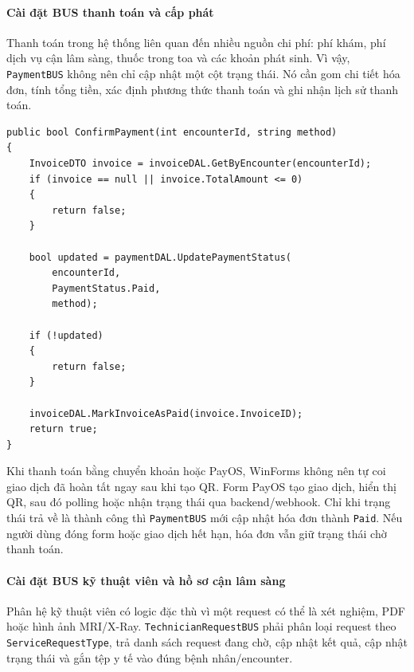 \documentclass[12pt,a4paper]{article}
\numberwithin{figure}{subsection}
\numberwithin{table}{subsection}
\newcounter{codecounter}
\newenvironment{codeblock}[2]{%
    \refstepcounter{codecounter}%
    \phantomsection%
    \label{#1}%
    \par\smallskip
}{%
    \par\smallskip
}
\begin{document}
\paragraph{Cài đặt BUS thanh toán và cấp phát}

Thanh toán trong hệ thống liên quan đến nhiều nguồn chi phí: phí khám, phí dịch vụ cận lâm sàng, thuốc trong toa và các khoản phát sinh. Vì vậy, \texttt{PaymentBUS} không nên chỉ cập nhật một cột trạng thái. Nó cần gom chi tiết hóa đơn, tính tổng tiền, xác định phương thức thanh toán và ghi nhận lịch sử thanh toán.

\begin{codeblock}{code:payment-business-flow}{Luồng xác nhận thanh toán trong BUS}
\begin{verbatim}
public bool ConfirmPayment(int encounterId, string method)
{
    InvoiceDTO invoice = invoiceDAL.GetByEncounter(encounterId);
    if (invoice == null || invoice.TotalAmount <= 0)
    {
        return false;
    }

    bool updated = paymentDAL.UpdatePaymentStatus(
        encounterId,
        PaymentStatus.Paid,
        method);

    if (!updated)
    {
        return false;
    }

    invoiceDAL.MarkInvoiceAsPaid(invoice.InvoiceID);
    return true;
}
\end{verbatim}
\end{codeblock}

Khi thanh toán bằng chuyển khoản hoặc PayOS, WinForms không nên tự coi giao dịch đã hoàn tất ngay sau khi tạo QR. Form PayOS tạo giao dịch, hiển thị QR, sau đó polling hoặc nhận trạng thái qua backend/webhook. Chỉ khi trạng thái trả về là thành công thì \texttt{PaymentBUS} mới cập nhật hóa đơn thành \texttt{Paid}. Nếu người dùng đóng form hoặc giao dịch hết hạn, hóa đơn vẫn giữ trạng thái chờ thanh toán.

\paragraph{Cài đặt BUS kỹ thuật viên và hồ sơ cận lâm sàng}

Phân hệ kỹ thuật viên có logic đặc thù vì một request có thể là xét nghiệm, PDF hoặc hình ảnh MRI/X-Ray. \texttt{TechnicianRequestBUS} phải phân loại request theo \texttt{ServiceRequestType}, trả danh sách request đang chờ, cập nhật kết quả, cập nhật trạng thái và gắn tệp y tế vào đúng bệnh nhân/encounter.
\end{document}
